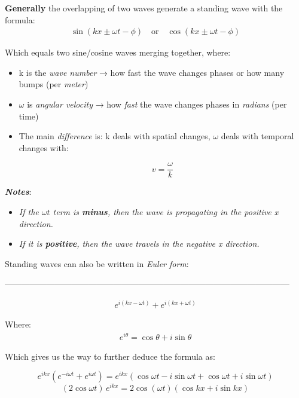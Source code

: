 \documentclass[12pt]{article}
\begin{document}
\noindent
\textbf{Generally} the overlapping of two waves generate a standing wave with the formula:
\begin{align}
\sin(kx \pm \omega t - \phi)
\quad\text{or}\quad
\cos(kx \pm \omega t - \phi)
\end{align}

Which equals two sine/cosine waves merging together, where:
\begin{itemize}
    \item k is the \textit{wave number} → how fast the wave changes phases or how many bumps (per \textit{meter})
    \item $\omega$ is\textit{ angular velocity} →  how \textit{fast} the wave changes phases in \textit{radians} (per time)
    \item The main \textit{difference} is:  k deals with spatial changes,  $\omega$ deals with temporal changes with:

    \[
        v = \frac{\omega}{k}
\]
\end{itemize}


{\small
\linespread{0.5}
 \textit{\textbf{Notes}}:
\begin{itemize}
    \item \textit{If the ${\omega {t}}$ term is \textit{\textbf{minus}}, then the wave is propagating in the positive x direction.}
    \item \textit{If it is \textbf{positive}, then the wave travels in the negative x direction.}

\end{itemize}
}

Standing waves can also be written in\textit{ Euler form}:

\noindent
------------------------------------------------------------------------------------------------------

\begin{align}
e^{i(kx - \omega t)} + e^{i(kx + \omega t)}
\end{align}

Where:
\begin{align}
e^{i\theta} = \cos\theta + i\sin\theta
\end{align}

Which gives us the way to further deduce the formula as:

\[
e^{ikx}(e^{-i\omega t} + e^{i\omega t})
= e^{ikx}(\cos\omega t - i\sin\omega t + \cos\omega t + i\sin\omega t)
\]
\[(2\cos\omega t)\, e^{ikx}
= 2\cos(\omega t)(\cos kx + i \sin kx)\]
\end{document}
